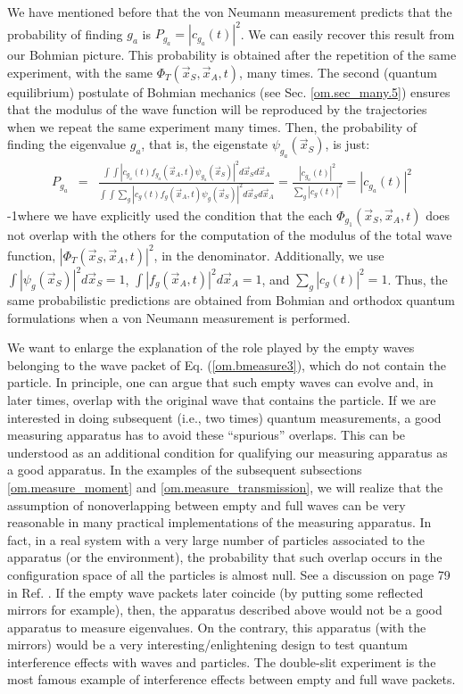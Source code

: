 \documentclass[nofootinbib, secnumarabic, amsmath, nobibnotes,11pt,aps,pra, floatfix]{revtex4-1}
\newcommand{\sref}[1]{Sec. \ref{#1}}
\newcommand{\eref}[1]{Eq. (\ref{#1})}
\begin{document}
We have mentioned before that the von Neumann measurement predicts that the probability of finding $g_a$ is $P_{g_a} = |c_{g_a}(t)|^2$. We can easily recover this result from our Bohmian picture. This probability is obtained after the repetition of the same experiment, with the same $\Phi_T(\vec x_S,\vec x_A,t)$, many times. The second (quantum equilibrium) postulate of Bohmian mechanics (see \sref{om.sec_many.5}) ensures that the modulus of the wave function will be reproduced by the trajectories when we repeat the same experiment many times. Then, the probability of finding the eigenvalue $g_a$, that is, the eigenstate $\psi_{g_a}(\vec x_S)$, is just:
\begin{eqnarray}
P_{g_a} &=& \frac {\int \int |c_{g_a}(t) f_{g_a}(\vec x_A,t) \psi_{g_a}(\vec x_S)|^2 d\vec x_S d\vec x_A} {\int \int \sum_{g} |c_g(t) f_g(\vec x_A,t) \psi_g(\vec x_S)|^2 d\vec x_S d\vec x_A}= \frac {|c_{g_a}(t)|^2} {\sum_{g} |c_g(t)|^2} = |c_{g_a}(t)|^2
\end{eqnarray}
\looseness-1where we have explicitly used the condition that the each
\textit{$\Phi_{g_1}(\vec x_S,\vec x_A,t)$} does not overlap with the others for the
computation of the modulus of the total wave function,
\textit{$|\Phi_T(\vec x_S,\vec x_A,t)|^2$}, in the denominator.
Additionally, we use $\int |\psi_g(\vec x_S)|^2 d\vec x_S = 1$,
$\int |f_g(\vec x_A,t)|^2 d\vec x_A = 1$, and $\sum_{g} |c_g(t)|^2 =
1$. Thus, the same probabilistic predictions are obtained from
Bohmian and orthodox quantum formulations when a von Neumann
measurement is performed.

We want to enlarge the explanation of the role played by the empty waves belonging to the wave packet of \eref{om.bmeasure3}, which do not contain the particle. In principle, one can argue that such empty waves can evolve and, in later times, overlap with the original wave that contains the particle. If we are interested in doing subsequent (i.e., two times) quantum measurements, a good measuring apparatus has to avoid these ``spurious'' overlaps. This can be understood as an additional condition for qualifying our measuring apparatus as a good apparatus. In the examples of the subsequent subsections \ref{om.measure_moment} and \ref{om.measure_transmission}, we will realize that the assumption of nonoverlapping between empty and full waves can be very reasonable in many practical implementations of the measuring apparatus. In fact, in a real system with a very large number of particles associated to the apparatus (or the environment), the probability that such overlap occurs in the configuration space of all the particles is almost null. See a discussion on page 79 in Ref. \cite{om.bomhhiley1993}. If the empty wave packets later coincide (by putting some reflected mirrors for example), then, the apparatus described above would not be a good apparatus to measure eigenvalues. On the contrary, this apparatus (with the mirrors) would be a very interesting/enlightening design to test quantum interference effects with waves and particles. The double-slit experiment is the most famous example of interference effects between empty and full wave packets.      
\end{document}

